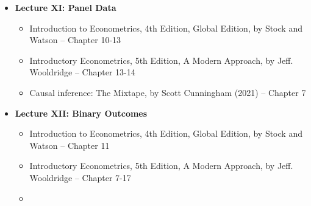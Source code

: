 \documentclass[12pt]{article}
\begin{document}
\begin{itemize}
    \item \textbf{Lecture XI: Panel Data}
    \begin{itemize}
        \item Introduction to Econometrics, 4th Edition, Global Edition, by Stock and Watson -- Chapter 10-13
        \item Introductory Econometrics, 5th Edition, A Modern Approach, by Jeff. Wooldridge -- Chapter 13-14
        \item  Causal inference: The Mixtape, by Scott Cunningham (2021) -- Chapter 7
    \end{itemize}

    \item \textbf{Lecture XII: Binary Outcomes}
    \begin{itemize}
        \item Introduction to Econometrics, 4th Edition, Global Edition, by Stock and Watson -- Chapter 11
        \item Introductory Econometrics, 5th Edition, A Modern Approach, by Jeff. Wooldridge -- Chapter 7-17
        \item  

    \end{itemize}

\end{itemize}
\end{document}
